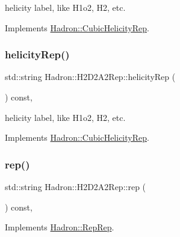 helicity label, like H1o2, H2, etc. 

Implements \mbox{\hyperlink{structHadron_1_1CubicHelicityRep_af1096946b7470edf0a55451cc662f231}{Hadron\+::\+Cubic\+Helicity\+Rep}}.

\mbox{\label{structHadron_1_1H2D2A2Rep_adfa1f1bca5e0e98eb2eca39372ca7245}} 
\subsubsection{\texorpdfstring{helicityRep()}{helicityRep()}\hspace{0.1cm}{\footnotesize\ttfamily [3/3]}}
{\footnotesize\ttfamily std\+::string Hadron\+::\+H2\+D2\+A2\+Rep\+::helicity\+Rep (\begin{DoxyParamCaption}{ }\end{DoxyParamCaption}) const\hspace{0.3cm}{\ttfamily [inline]}, {\ttfamily [virtual]}}

helicity label, like H1o2, H2, etc. 

Implements \mbox{\hyperlink{structHadron_1_1CubicHelicityRep_af1096946b7470edf0a55451cc662f231}{Hadron\+::\+Cubic\+Helicity\+Rep}}.

\mbox{\label{structHadron_1_1H2D2A2Rep_a41083c39082d6fee296da79892e8b053}} 
\subsubsection{\texorpdfstring{rep()}{rep()}\hspace{0.1cm}{\footnotesize\ttfamily [1/5]}}
{\footnotesize\ttfamily std\+::string Hadron\+::\+H2\+D2\+A2\+Rep\+::rep (\begin{DoxyParamCaption}{ }\end{DoxyParamCaption}) const\hspace{0.3cm}{\ttfamily [inline]}, {\ttfamily [virtual]}}



Implements \mbox{\hyperlink{structHadron_1_1RepRep_ab3213025f6de249f7095892109575fde}{Hadron\+::\+Rep\+Rep}}.

\mbox{\label{structHadron_1_1H2D2A2Rep_a41083c39082d6fee296da79892e8b053}} 
